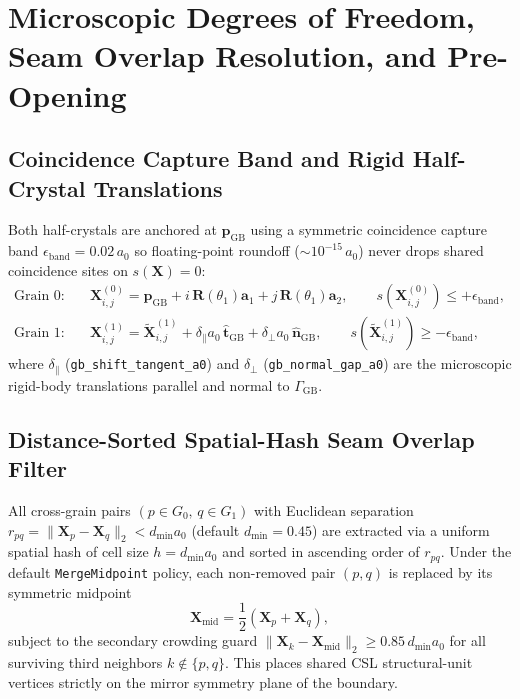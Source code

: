 \documentclass[11pt,a4paper]{article}
\newcommand{\code}[1]{\texttt{#1}}
\begin{document}
\section{Microscopic Degrees of Freedom, Seam Overlap Resolution, and Pre-Opening}

\subsection{Coincidence Capture Band and Rigid Half-Crystal Translations}
Both half-crystals are anchored at $\mathbf{p}_{\text{GB}}$ using a symmetric coincidence capture band $\epsilon_{\text{band}} = 0.02\,a_0$ so floating-point roundoff ($\sim 10^{-15}\,a_0$) never drops shared coincidence sites on $s(\mathbf{X}) = 0$:
\begin{align}
  \text{Grain 0:}\quad & \mathbf{X}_{i,j}^{(0)} = \mathbf{p}_{\text{GB}} + i\,\mathbf{R}(\theta_1)\mathbf{a}_1 + j\,\mathbf{R}(\theta_1)\mathbf{a}_2, \qquad s(\mathbf{X}_{i,j}^{(0)}) \le +\epsilon_{\text{band}}, \\
  \text{Grain 1:}\quad & \mathbf{X}_{i,j}^{(1)} = \tilde{\mathbf{X}}_{i,j}^{(1)} + \delta_\parallel a_0\,\hat{\mathbf{t}}_{\text{GB}} + \delta_\perp a_0\,\hat{\mathbf{n}}_{\text{GB}}, \qquad s(\tilde{\mathbf{X}}_{i,j}^{(1)}) \ge -\epsilon_{\text{band}},
\end{align}
where $\delta_\parallel$ (\code{gb\_shift\_tangent\_a0}) and $\delta_\perp$ (\code{gb\_normal\_gap\_a0}) are the microscopic rigid-body translations parallel and normal to $\Gamma_{\text{GB}}$.

\subsection{Distance-Sorted Spatial-Hash Seam Overlap Filter}
All cross-grain pairs $(p \in G_0,\, q \in G_1)$ with Euclidean separation $r_{pq} = \|\mathbf{X}_p - \mathbf{X}_q\|_2 < d_{\min} a_0$ (default $d_{\min} = 0.45$) are extracted via a uniform spatial hash of cell size $h = d_{\min} a_0$ and sorted in ascending order of $r_{pq}$. Under the default \code{MergeMidpoint} policy, each non-removed pair $(p,q)$ is replaced by its symmetric midpoint
\begin{equation}
  \mathbf{X}_{\text{mid}} = \frac{1}{2}\left(\mathbf{X}_p + \mathbf{X}_q\right),
\end{equation}
subject to the secondary crowding guard $\|\mathbf{X}_k - \mathbf{X}_{\text{mid}}\|_2 \ge 0.85\,d_{\min} a_0$ for all surviving third neighbors $k \notin \{p,q\}$. This places shared CSL structural-unit vertices strictly on the mirror symmetry plane of the boundary.
\end{document}
